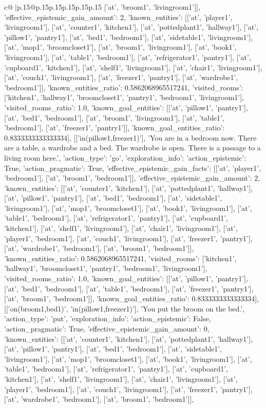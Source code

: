 \documentclass{article}
\begin{document}
{\begin{supertabular}{c@{$\;$}|p{.15\linewidth}@{}p{.15\linewidth}p{.15\linewidth}p{.15\linewidth}p{.15\linewidth}p{.15\linewidth}}
{{{['at', 'broom1', 'livingroom1']], 'effective_epistemic_gain_amount': 2, 'known_entities': [['at', 'player1', 'livingroom1'], ['at', 'counter1', 'kitchen1'], ['at', 'pottedplant1', 'hallway1'], ['at', 'pillow1', 'pantry1'], ['at', 'bed1', 'bedroom1'], ['at', 'sidetable1', 'livingroom1'], ['at', 'mop1', 'broomcloset1'], ['at', 'broom1', 'livingroom1'], ['at', 'book1', 'livingroom1'], ['at', 'table1', 'bedroom1'], ['at', 'refrigerator1', 'pantry1'], ['at', 'cupboard1', 'kitchen1'], ['at', 'shelf1', 'livingroom1'], ['at', 'chair1', 'livingroom1'], ['at', 'couch1', 'livingroom1'], ['at', 'freezer1', 'pantry1'], ['at', 'wardrobe1', 'bedroom1']], 'known_entities_ratio': 0.5862068965517241, 'visited_rooms': ['kitchen1', 'hallway1', 'broomcloset1', 'pantry1', 'bedroom1', 'livingroom1'], 'visited_rooms_ratio': 1.0, 'known_goal_entities': [['at', 'pillow1', 'pantry1'], ['at', 'bed1', 'bedroom1'], ['at', 'broom1', 'livingroom1'], ['at', 'table1', 'bedroom1'], ['at', 'freezer1', 'pantry1']], 'known_goal_entities_ratio': 0.8333333333333334}}], [['in(pillow1,freezer1)'], 'You are in a bedroom now. There are a table, a wardrobe and a bed. The wardrobe is open. There is a passage to a living room here.', {'action_type': 'go', 'exploration_info': {'action_epistemic': True, 'action_pragmatic': True, 'effective_epistemic_gain_facts': [['at', 'player1', 'bedroom1'], ['at', 'broom1', 'bedroom1']], 'effective_epistemic_gain_amount': 2, 'known_entities': [['at', 'counter1', 'kitchen1'], ['at', 'pottedplant1', 'hallway1'], ['at', 'pillow1', 'pantry1'], ['at', 'bed1', 'bedroom1'], ['at', 'sidetable1', 'livingroom1'], ['at', 'mop1', 'broomcloset1'], ['at', 'book1', 'livingroom1'], ['at', 'table1', 'bedroom1'], ['at', 'refrigerator1', 'pantry1'], ['at', 'cupboard1', 'kitchen1'], ['at', 'shelf1', 'livingroom1'], ['at', 'chair1', 'livingroom1'], ['at', 'player1', 'bedroom1'], ['at', 'couch1', 'livingroom1'], ['at', 'freezer1', 'pantry1'], ['at', 'wardrobe1', 'bedroom1'], ['at', 'broom1', 'bedroom1']], 'known_entities_ratio': 0.5862068965517241, 'visited_rooms': ['kitchen1', 'hallway1', 'broomcloset1', 'pantry1', 'bedroom1', 'livingroom1'], 'visited_rooms_ratio': 1.0, 'known_goal_entities': [['at', 'pillow1', 'pantry1'], ['at', 'bed1', 'bedroom1'], ['at', 'table1', 'bedroom1'], ['at', 'freezer1', 'pantry1'], ['at', 'broom1', 'bedroom1']], 'known_goal_entities_ratio': 0.8333333333333334}}], [['on(broom1,bed1)', 'in(pillow1,freezer1)'], 'You put the broom on the bed.', {'action_type': 'put', 'exploration_info': {'action_epistemic': False, 'action_pragmatic': True, 'effective_epistemic_gain_amount': 0, 'known_entities': [['at', 'counter1', 'kitchen1'], ['at', 'pottedplant1', 'hallway1'], ['at', 'pillow1', 'pantry1'], ['at', 'bed1', 'bedroom1'], ['at', 'sidetable1', 'livingroom1'], ['at', 'mop1', 'broomcloset1'], ['at', 'book1', 'livingroom1'], ['at', 'table1', 'bedroom1'], ['at', 'refrigerator1', 'pantry1'], ['at', 'cupboard1', 'kitchen1'], ['at', 'shelf1', 'livingroom1'], ['at', 'chair1', 'livingroom1'], ['at', 'player1', 'bedroom1'], ['at', 'couch1', 'livingroom1'], ['at', 'freezer1', 'pantry1'], ['at', 'wardrobe1', 'bedroom1'], ['at', 'broom1', 'bedroom1']], }}}
\end{supertabular}}
\end{document}
